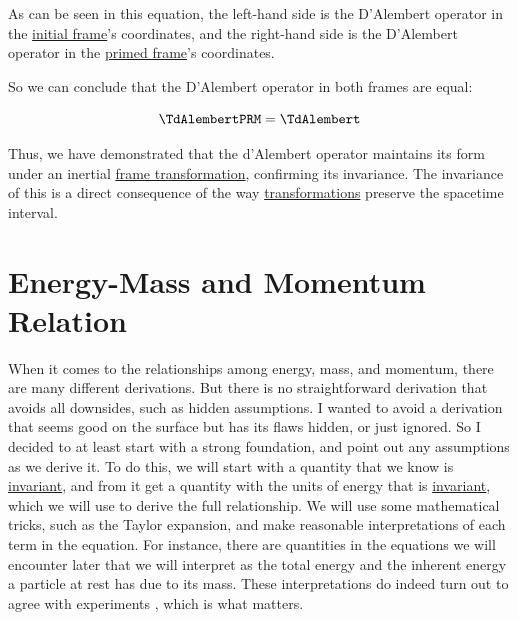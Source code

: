 \begin{derivation}
	As can be seen in this equation, the left-hand side is the D'Alembert operator in the \hyperlink{def-initial-Frame}{initial frame}'s coordinates, and the right-hand side is the D'Alembert operator in the \hyperlink{def-Primed-Frame}{primed frame}'s coordinates.

	So we can conclude that the D'Alembert operator in both frames are equal:

	\begin{equation}
		\TdAlembertPRM  = \TdAlembert
	\end{equation}

\end{derivation}

Thus, we have demonstrated that the d'Alembert operator maintains its form under an inertial \hyperlink{def-transform}{frame transformation}, confirming its invariance.
The invariance of this is a direct consequence of the way \hyperlink{def-transform}{transformations} preserve the spacetime interval.

\section{Energy-Mass and Momentum Relation} \label{sect: Energy-Mass and Momentum Relation}

When it comes to the relationships among energy, mass, and momentum, there are many different derivations.
But there is no straightforward derivation that avoids all downsides, such as hidden assumptions.
I wanted to avoid a derivation that seems good on the surface but has its flaws hidden, or just ignored.
So I decided to at least start with a strong foundation, and point out any assumptions as we derive it.
To do this, we will start with a quantity that we know is \hyperlink{def-lorentz-invariant}{invariant}, and from it get a quantity with the units of energy that is \hyperlink{def-lorentz-invariant}{invariant}, which we will use to derive the full relationship.
We will use some mathematical tricks, such as the Taylor expansion, and make reasonable interpretations of each term in the equation.
For instance, there are quantities in the equations we will encounter later that we will interpret as the total energy and the inherent energy a particle at rest has due to its mass.
These interpretations do indeed turn out to agree with experiments \cite{SRtestsWiki,SRtestsUniCR}, which is what matters.

